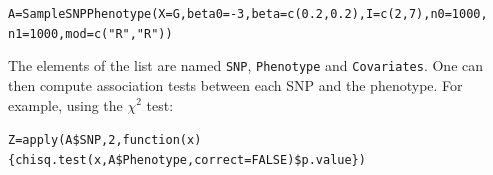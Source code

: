 \documentclass[12pt]{article}
\begin{document}
	\begin{alltt}
		A = SampleSNPPhenotype(X=G,beta0=-3,beta=c(0.2,0.2),I=c(2,7),n0=1000,
		\hspace{2em}n1=1000,mod=c("R","R"))
	\end{alltt}

	\noindent The elements of the list are named \texttt{SNP}, \texttt{Phenotype} and \texttt{Covariates}. One can then compute association tests between each SNP and the phenotype. For example, using the $\chi^{2}$ test:
	\begin{alltt}
		Z = apply(A\$SNP,2,function(x)\{chisq.test(x,A\$Phenotype,correct=FALSE)\$p.value\})
	\end{alltt}

	
	
\end{document}
